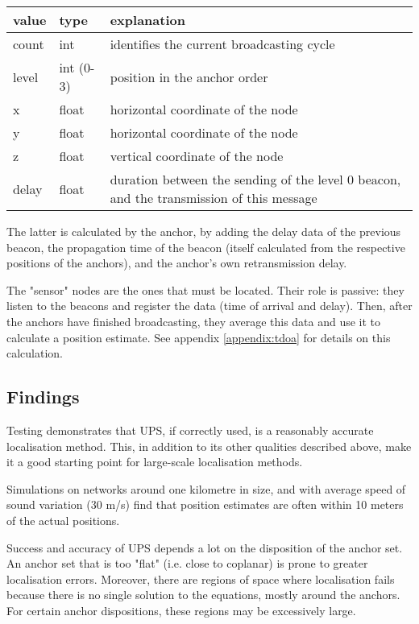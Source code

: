 \documentclass[12pt,a4paper,fleqn]{report}
\begin{document}
\begin{tabular}{|l|l|p{9cm}|}
	\hline
	\textbf{value} & \textbf{type} & \textbf{explanation} \\
	\hline
	count	& int		&
	identifies the current broadcasting cycle \\
	\hline
	level	& int (0-3)	&
	position in the anchor order \\
	\hline
	x		& float		&
	horizontal coordinate of the node \\
	\hline
	y		& float		&
	horizontal coordinate of the node \\
	\hline
	z		& float		&
	vertical coordinate of the node \\
	\hline
	delay	& float		&
	duration between the sending of the level 0 beacon, and the transmission of this message \\
	\hline
\end{tabular}

\medskip

The latter is calculated by the anchor, by adding the delay data of the previous beacon, the propagation time of the beacon (itself calculated from the respective positions of the anchors), and the anchor's own retransmission delay.

The "sensor" nodes are the ones that must be located. Their role is passive: they listen to the beacons and register the data (time of arrival and delay). Then, after the anchors have finished broadcasting, they average this data and use it to calculate a position estimate. See appendix \ref{appendix:tdoa} for details on this calculation.

\subsection{Findings}

Testing demonstrates that UPS, if correctly used, is a reasonably accurate localisation method. This, in addition to its other qualities described above, make it a good starting point for large-scale localisation methods.

Simulations on networks around one kilometre in size, and with average speed of sound variation (30 m/s) find that position estimates are often within 10 meters of the actual positions.

Success and accuracy of UPS depends a lot on the disposition of the anchor set. An anchor set that is too "flat" (i.e. close to coplanar) is prone to greater localisation errors. Moreover, there are regions of space where localisation fails because there is no single solution to the equations, mostly around the anchors. For certain anchor dispositions, these regions may be excessively large.
\end{document}
